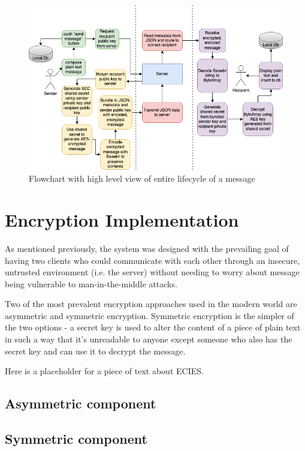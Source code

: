 \documentclass{mproj}
\begin{document}
\begin{figure}[H]
\includegraphics[scale=0.5]{images/message-flow.png}
\caption{Flowchart with high level view of entire lifecycle of a message}
\end{figure}

\section{Encryption Implementation}\label{encryption}
As mentioned previously, the system was designed with the prevailing goal of having two clients who could communicate with each other through an insecure, untrusted environment (i.e. the server) without needing to worry about message being vulnerable to man-in-the-middle attacks\cite{mallik2019man}.

Two of the most prevalent encryption approaches used in the modern world are asymmetric and symmetric encryption. Symmetric encryption is the simpler of the two options - a secret key is used to alter the content of a piece of plain text in such a way that it's unreadable to anyone except someone who also has the secret key and can use it to decrypt the message.

\cite{martinez2010comparison}Here is a placeholder for a piece of text about ECIES.
\subsection{Asymmetric component}\label{asymmetric}

\subsection{Symmetric component}\label{symmetric}
\end{document}
